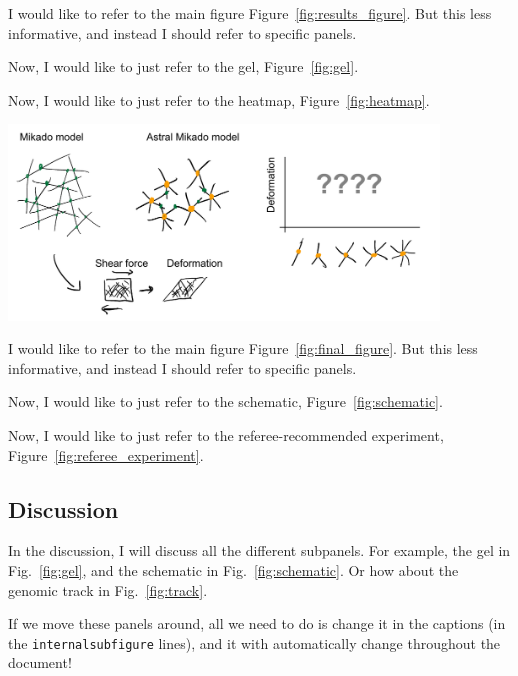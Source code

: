 \documentclass[onecolumn,11pt]{article}
\begin{document}
I would like to refer to the main figure Figure~\ref{fig:results_figure}. But this less informative, and instead I should refer to specific panels.

Now, I would like to just refer to the gel, Figure~\ref{fig:gel}.

Now, I would like to just refer to the heatmap, Figure~\ref{fig:heatmap}.




\clearpage

\begin{busyfigure}[ht]
        \centering
        \includegraphics[width=4.5in]{figures/figJeanJacket.pdf}
\end{busyfigure}

I would like to refer to the main figure Figure~\ref{fig:final_figure}. But this less informative, and instead I should refer to specific panels.

Now, I would like to just refer to the schematic, Figure~\ref{fig:schematic}.

Now, I would like to just refer to the referee-recommended experiment, Figure~\ref{fig:referee_experiment}.


\clearpage

\subsection*{Discussion}

In the discussion, I will discuss all the different subpanels.
For example, the gel in Fig.~\ref{fig:gel}, and the schematic in Fig.~\ref{fig:schematic}.
Or how about the genomic track in Fig.~\ref{fig:track}.


If we move these panels around, all we need to do is change it in the captions (in the \verb|internalsubfigure| lines), and it with automatically change throughout the document! 
\end{document}
